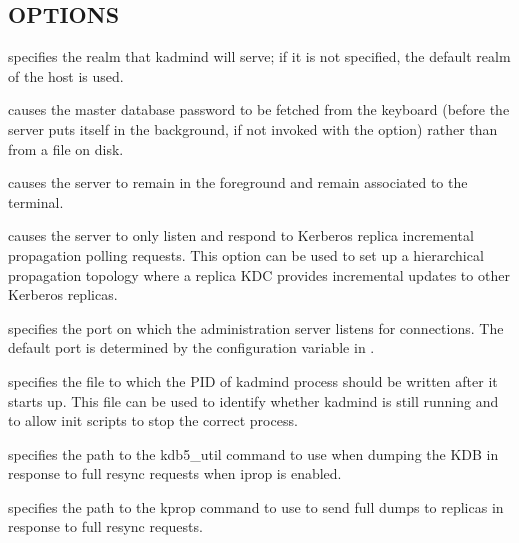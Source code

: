 \documentclass[letterpaper,10pt,english]{sphinxmanual}
\begin{document}
\subsection{OPTIONS}
\label{\detokenize{admin/admin_commands/kadmind:options}}\begin{description}
\sphinxAtStartPar
specifies the realm that kadmind will serve; if it is not
specified, the default realm of the host is used.

\sphinxAtStartPar
causes the master database password to be fetched from the
keyboard (before the server puts itself in the background, if not
invoked with the  option) rather than from a file on
disk.

\sphinxAtStartPar
causes the server to remain in the foreground and remain
associated to the terminal.

\sphinxAtStartPar
causes the server to only listen and respond to Kerberos replica
incremental propagation polling requests.  This option can be used
to set up a hierarchical propagation topology where a replica KDC
provides incremental updates to other Kerberos replicas.

\sphinxAtStartPar
specifies the port on which the administration server listens for
connections.  The default port is determined by the
 configuration variable in {\hyperref[\detokenize{admin/conf_files/kdc_conf:kdc-conf-5}]{}}.

\sphinxAtStartPar
specifies the file to which the PID of kadmind process should be
written after it starts up.  This file can be used to identify
whether kadmind is still running and to allow init scripts to stop
the correct process.

\sphinxAtStartPar
specifies the path to the kdb5\_util command to use when dumping the
KDB in response to full resync requests when iprop is enabled.

\sphinxAtStartPar
specifies the path to the kprop command to use to send full dumps
to replicas in response to full resync requests.


\end{description}
\end{document}
